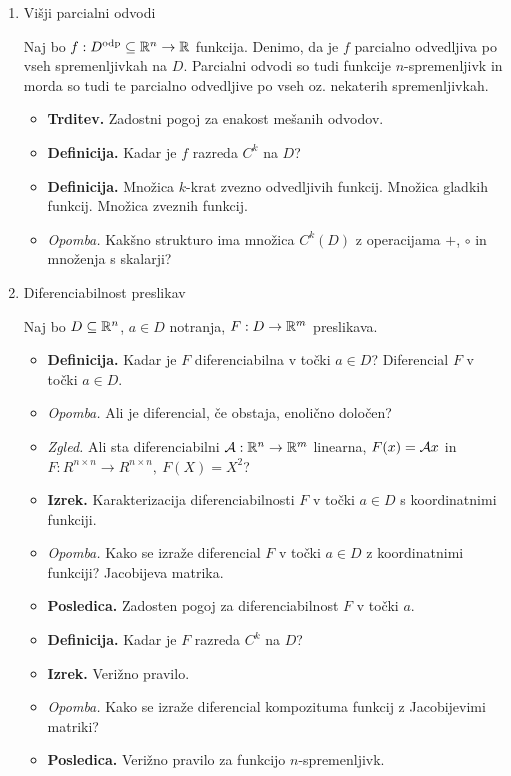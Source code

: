 \begin{enumerate}
    \item Višji parcialni odvodi
    
    Naj bo $f: D^\text{odp} \subseteq \mathbb{R}^n \to \mathbb{R}$ funkcija. Denimo, da je $f$ parcialno odvedljiva po vseh spremenljivkah na $D$. Parcialni odvodi so tudi funkcije $n$-spremenljivk in morda so tudi te parcialno odvedljive po vseh oz. nekaterih spremenljivkah.
    
    \begin{itemize}
        \item \colorbox{blue!30}{\textbf{Trditev.}} Zadostni pogoj za enakost mešanih odvodov.
        \item \colorbox{purple!30}{\textbf{Definicija.}} Kadar je $f$ razreda $C^k$ na $D$?
        \item \colorbox{purple!30}{\textbf{Definicija.}}  Množica $k$-krat zvezno odvedljivih funkcij. Množica gladkih funkcij. Množica zveznih funkcij.
        \item \colorbox{yellow!30}{\emph{Opomba.}} Kakšno strukturo ima množica $C^k(D)$ z operacijama $+$, $\circ$ in množenja s skalarji?
    \end{itemize}

    \item Diferenciabilnost preslikav
    
    Naj bo $D \subseteq \mathbb{R}^n$, $a \in D$ notranja, $F: D \to \mathbb{R}^m$ preslikava.
    \begin{itemize}
        \item \colorbox{purple!30}{\textbf{Definicija.}} Kadar je $F$ diferenciabilna v točki $a \in D$? Diferencial $F$ v točki $a \in D$.
        \item \colorbox{yellow!30}{\emph{Opomba.}} Ali je diferencial, če obstaja, enolično določen?
        \item \colorbox{yellow!30}{\emph{Zgled.}} Ali sta diferenciabilni $\mathcal{A}: \mathbb{R}^n \to \mathbb{R}^m$ linearna, $F(x) = \mathcal{A}x$ in $F: 
        R^{n \times n} \to R^{n \times n}, \ F(X) = X^2$?
        \item \colorbox{blue!30}{\textbf{Izrek.}} Karakterizacija diferenciabilnosti $F$ v točki $a \in D$ s koordinatnimi funkciji. 
        \item \colorbox{yellow!30}{\emph{Opomba.}} Kako se izraže diferencial $F$ v točki $a \in D$ z koordinatnimi funkciji? Jacobijeva matrika.
        \item \colorbox{orange!30}{\textbf{Posledica.}} Zadosten pogoj za diferenciabilnost $F$ v točki $a$.
        \item \colorbox{purple!30}{\textbf{Definicija.}} Kadar je $F$ razreda $C^k$ na $D$?
        \item \colorbox{blue!30}{\textbf{Izrek.}} Verižno pravilo.
        \item \colorbox{yellow!30}{\emph{Opomba.}} Kako se izraže diferencial kompozituma funkcij z Jacobijevimi matriki?
        \item \colorbox{orange!30}{\textbf{Posledica.}} Verižno pravilo za funkcijo $n$-spremenljivk.
    \end{itemize}
\end{enumerate}

